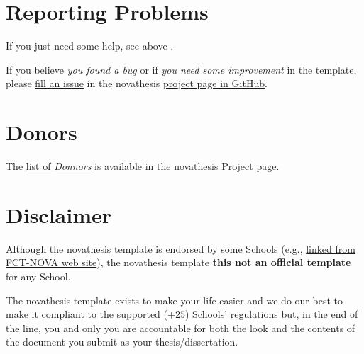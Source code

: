 \begin{center}  
\end{center}
 

\section{Reporting Problems}
\label{sec:reporting_problems}

If you just need some help, see above .

If you believe \emph{you found a bug} or if \emph{you need some improvement} in the template, please \href{https://github.com/joaomlourenco/novathesis/issues}{fill an issue} in the \gls{novathesis} \href{https://github.com/joaomlourenco/novathesis/issues}{project page in GitHub}.


\section{Donors}
\label{sec:donations}

The \href{https://github.com/joaomlourenco/novathesis/wiki#donators}{list of \emph{Donnors}} is available in the \gls{novathesis} Project page.


\section{Disclaimer}
\label{sec:disclaimer}

Although the \gls{novathesis} template is endorsed by some Schools (e.g., \href{https://www.fct.unl.pt/estudante/informacao-academica/teses-e-dissertacoes}{linked from FCT-NOVA web site}), the \gls{novathesis} template \textbf{this not an official template} for any School.

The \gls{novathesis} template exists to make your life easier and we do our best to make it compliant to the supported ($+25$) Schools' regulations but, in the end of the line, you and only you are accountable for both the look and the contents of the document you submit as your thesis/dissertation.

